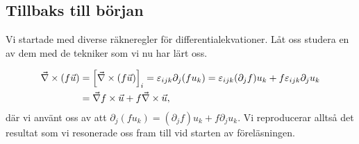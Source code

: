 \documentclass[%
oneside,                 %
final,                   %
10pt]{article}
\begin{document}
\subsection*{Tillbaks till början}

Vi startade med diverse räkneregler för differentialekvationer. Låt oss studera en av dem med de tekniker som vi nu har lärt oss.

\begin{align*}
  \vec{\nabla} \times \left(f\vec{u}\right) 
  &= 
  \left[ \vec{\nabla} \times \left(f\vec{u}\right)\right]_i 
  = \varepsilon_{ijk} \partial_j (f u_k) 
  = \varepsilon_{ijk} (\partial_j f) u_k + f \varepsilon_{ijk} \partial_j u_k  \\
  &=\vec{\nabla} f\times \vec{u} + f \vec{\nabla} \times \vec{u},
\end{align*}
där vi använt oss av att $\partial_j (f u_k) = (\partial_j f) u_k + f \partial_j u_k$. Vi reproducerar alltså det resultat som vi resonerade oss fram till vid starten av föreläsningen.


\end{document}
